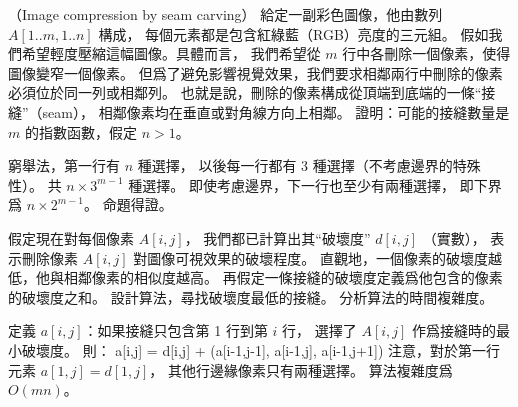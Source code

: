 \startPROBLEM
（Image compression by seam carving）
給定一副彩色圖像，他由數列 $A[1..m,1..n]$ 構成，
每個元素都是包含紅綠藍（RGB）亮度的三元組。
假如我們希望輕度壓縮這幅圖像。具體而言，
我們希望從 $m$ 行中各刪除一個像素，使得圖像變窄一個像素。
但爲了避免影響視覺效果，我們要求相鄰兩行中刪除的像素必須位於同一列或相鄰列。
也就是說，刪除的像素構成從頂端到底端的一條“接縫”（seam），
相鄰像素均在垂直或對角線方向上相鄰。
\startigBase[a]\startitem
證明：可能的接縫數量是 $m$ 的指數函數，假定 $n>1$。
\stopitem\stopigBase

\startANSWER
窮舉法，第一行有 $n$ 種選擇，
以後每一行都有 3 種選擇（不考慮邊界的特殊性）。
共 $n\times 3^{m-1}$ 種選擇。
即使考慮邊界，下一行也至少有兩種選擇，
即下界爲 $n\times 2^{m-1}$。
命題得證。
\stopANSWER

\startigBase[continue]\startitem
假定現在對每個像素 $A[i,j]$，
我們都已計算出其“破壞度” $d[i,j]$ （實數），
表示刪除像素 $A[i,j]$ 對圖像可視效果的破壞程度。
直觀地，一個像素的破壞度越低，他與相鄰像素的相似度越高。
再假定一條接縫的破壞度定義爲他包含的像素的破壞度之和。
設計算法，尋找破壞度最低的接縫。
分析算法的時間複雜度。
\stopitem\stopigBase

\startANSWER
定義 $a[i,j]$：如果接縫只包含第 1 行到第 $i$ 行，
選擇了 $A[i,j]$ 作爲接縫時的最小破壞度。
則：
\startformula
a[i,j] = d[i,j] + \min(a[i-1,j-1], a[i-1,j], a[i-1,j+1])
\stopformula
注意，對於第一行元素 $a[1,j] = d[1,j]$，
其他行邊緣像素只有兩種選擇。
算法複雜度爲 $O(mn)$。
\stopANSWER

\stopPROBLEM
